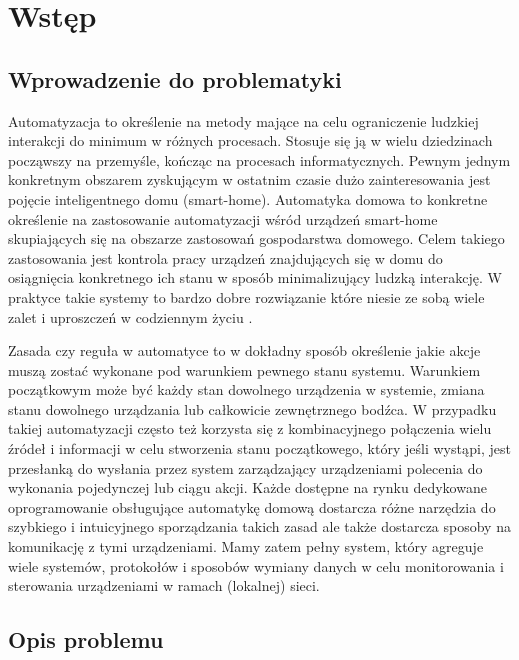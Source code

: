 
\chapter{Wstęp}

\section{Wprowadzenie do problematyki}

Automatyzacja to określenie na metody mające na celu ograniczenie ludzkiej interakcji do minimum w różnych procesach. Stosuje się ją w wielu dziedzinach począwszy na przemyśle, kończąc na procesach informatycznych. Pewnym jednym konkretnym obszarem zyskującym w ostatnim czasie dużo zainteresowania jest pojęcie inteligentnego domu (smart-home). Automatyka domowa to konkretne określenie na zastosowanie automatyzacji wśród urządzeń smart-home skupiających się na obszarze zastosowań gospodarstwa domowego. Celem takiego zastosowania jest kontrola pracy urządzeń znajdujących się w domu do osiągnięcia konkretnego ich stanu w sposób minimalizujący ludzką interakcję. W praktyce takie systemy to bardzo dobre rozwiązanie które niesie ze sobą wiele zalet i uproszczeń w codziennym życiu \cite{szablowski2019projektowanie}.

Zasada czy reguła w automatyce to w dokładny sposób określenie jakie akcje muszą zostać wykonane pod warunkiem pewnego stanu systemu. Warunkiem początkowym może być każdy stan dowolnego urządzenia w systemie, zmiana stanu dowolnego urządzania lub całkowicie zewnętrznego bodźca. W przypadku takiej automatyzacji często też korzysta się z kombinacyjnego połączenia wielu źródeł i informacji w celu stworzenia stanu początkowego, który jeśli wystąpi, jest przesłanką do wysłania przez system zarządzający urządzeniami polecenia do wykonania pojedynczej lub ciągu akcji. Każde dostępne na rynku dedykowane oprogramowanie obsługujące automatykę domową dostarcza różne narzędzia do szybkiego i intuicyjnego sporządzania takich zasad ale także dostarcza sposoby na komunikację z tymi urządzeniami. Mamy zatem pełny system, który agreguje wiele systemów, protokołów i sposobów wymiany danych w celu monitorowania i sterowania urządzeniami w ramach (lokalnej) sieci.

\section{Opis problemu}

